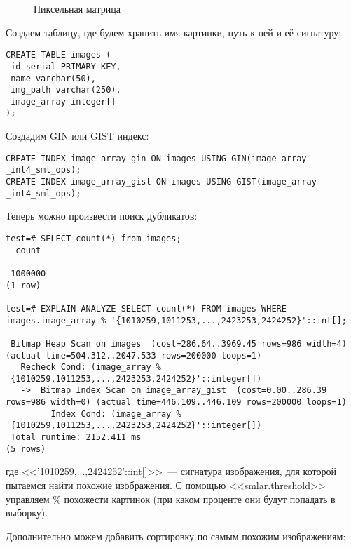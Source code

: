 \begin{figure}[ht!]
  \caption{Пиксельная матрица}
  \label{fig:smlar2}
\end{figure}

Создаем таблицу, где будем хранить имя картинки, путь к ней и её сигнатуру:

\begin{lstlisting}[label=lst:smlar8,caption=Таблица для изображений]
CREATE TABLE images (
 id serial PRIMARY KEY,
 name varchar(50),
 img_path varchar(250),
 image_array integer[]
);
\end{lstlisting}

Создадим GIN или GIST индекс:

\begin{lstlisting}[label=lst:smlar9,caption=Создание GIN или GIST индекса]
CREATE INDEX image_array_gin ON images USING GIN(image_array _int4_sml_ops);
CREATE INDEX image_array_gist ON images USING GIST(image_array _int4_sml_ops);
\end{lstlisting}

Теперь можно произвести поиск дубликатов:

\begin{lstlisting}[label=lst:smlar10,caption=Поиск дубликатов]
test=# SELECT count(*) from images;
  count
---------
 1000000
(1 row)

test=# EXPLAIN ANALYZE SELECT count(*) FROM images WHERE images.image_array % '{1010259,1011253,...,2423253,2424252}'::int[];

 Bitmap Heap Scan on images  (cost=286.64..3969.45 rows=986 width=4) (actual time=504.312..2047.533 rows=200000 loops=1)
   Recheck Cond: (image_array % '{1010259,1011253,...,2423253,2424252}'::integer[])
   ->  Bitmap Index Scan on image_array_gist  (cost=0.00..286.39 rows=986 width=0) (actual time=446.109..446.109 rows=200000 loops=1)
         Index Cond: (image_array % '{1010259,1011253,...,2423253,2424252}'::integer[])
 Total runtime: 2152.411 ms
(5 rows)
\end{lstlisting}

где <<'{1010259,...,2424252}'::int[]>>~--- сигнатура изображения, для которой пытаемся найти похожие изображения. С помощью <<smlar.threshold>> управляем \% похожести картинок (при каком проценте они будут попадать в выборку).

Дополнительно можем добавить сортировку по самым похожим изображениям:

